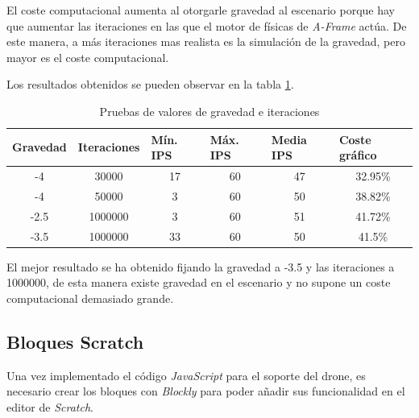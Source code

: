 El coste computacional aumenta al otorgarle gravedad al escenario porque hay que aumentar las iteraciones en las que el motor de físicas de \textit{A-Frame} actúa. De este manera, a más iteraciones mas realista es la simulación de la gravedad, pero mayor es el coste computacional.

Los resultados obtenidos se pueden observar en la tabla \ref{tab:tablaGravedad}.

\begin{table}[H]
\caption{Pruebas de valores de gravedad e iteraciones}
\centering
\label{tab:tablaGravedad}
\begin{tabular}{|c|c|c|c|c|c|}
\hline
\multicolumn{1}{|l|}{\textbf{Gravedad}} & \multicolumn{1}{l|}{\textbf{Iteraciones}} & \multicolumn{1}{l|}{\textbf{Mín. IPS}} & \multicolumn{1}{l|}{\textbf{Máx. IPS}} & \multicolumn{1}{l|}{\textbf{Media IPS}} & \multicolumn{1}{l|}{\textbf{Coste gráfico}} \\ \hline
-4 & 30000 & 17 & 60 & 47 & 32.95\% \\ \hline
-4 & 50000 & 3 & 60 & 50 & 38.82\% \\ \hline
-2.5 & 1000000 & 3 & 60 & 51 & 41.72\% \\ \hline
-3.5 & 1000000 & 33 & 60 & 50 & 41.5\% \\ \hline
\end{tabular}
\end{table}

El mejor resultado se ha obtenido fijando la gravedad a -3.5 y las iteraciones a 1000000, de esta manera existe gravedad en el escenario y no supone un coste computacional demasiado grande. 

\subsection{Bloques Scratch}

Una vez implementado el código \textit{JavaScript} para el soporte del drone, es necesario crear los bloques con \textit{Blockly} para poder añadir sus funcionalidad en el editor de \textit{Scratch}. 

